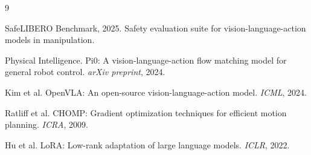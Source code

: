 \documentclass[letterpaper]{article}
\begin{document}

\begin{thebibliography}{9}

SafeLIBERO Benchmark, 2025.
Safety evaluation suite for vision-language-action models in manipulation.

Physical Intelligence.
Pi0: A vision-language-action flow matching model for general robot control.
\textit{arXiv preprint}, 2024.

Kim et al.
OpenVLA: An open-source vision-language-action model.
\textit{ICML}, 2024.

Ratliff et al.
CHOMP: Gradient optimization techniques for efficient motion planning.
\textit{ICRA}, 2009.

Hu et al.
LoRA: Low-rank adaptation of large language models.
\textit{ICLR}, 2022.

\end{thebibliography}
\end{document}
